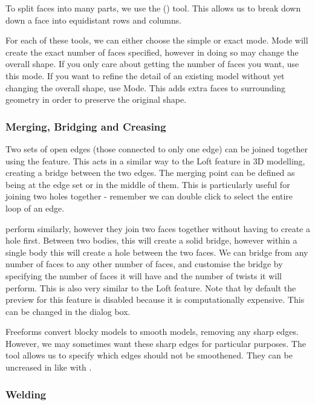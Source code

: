 To split faces into many parts, we use the () tool. This allows us to break down down a face into equidistant rows and columns.

For each of these tools, we can either choose the simple or exact mode.  Mode will create the exact number of faces specified, however in doing so may change the overall shape. If you only care about getting the number of faces you want, use this mode. If you want to refine the detail of an existing model without yet changing the overall shape, use  Mode. This adds extra faces to surrounding geometry in order to preserve the original shape.

\subsubsection{Merging, Bridging and Creasing}

Two sets of open edges (those connected to only one edge) can be joined together using the  feature. This acts in a similar way to the Loft feature in 3D modelling, creating a bridge between the two edges. The merging point can be defined as being at the edge set or in the middle of them. This is particularly useful for joining two holes together - remember we can double click to select the entire loop of an edge.

 perform similarly, however they join two faces together without having to create a hole first. Between two bodies, this will create a solid bridge, however within a single body this will create a hole between the two faces. We can bridge from any number of faces to any other number of faces, and customise the bridge by specifying the number of faces it will have and the number of twists it will perform. This is also very similar to the Loft feature. Note that by default the preview for this feature is disabled because it is computationally expensive. This can be changed in the dialog box.

Freeforms convert blocky models to smooth models, removing any sharp edges. However, we may sometimes want these sharp edges for particular purposes. The  tool allows us to specify which edges should not be smoothened. They can be uncreased in like with .

\subsubsection{Welding}

